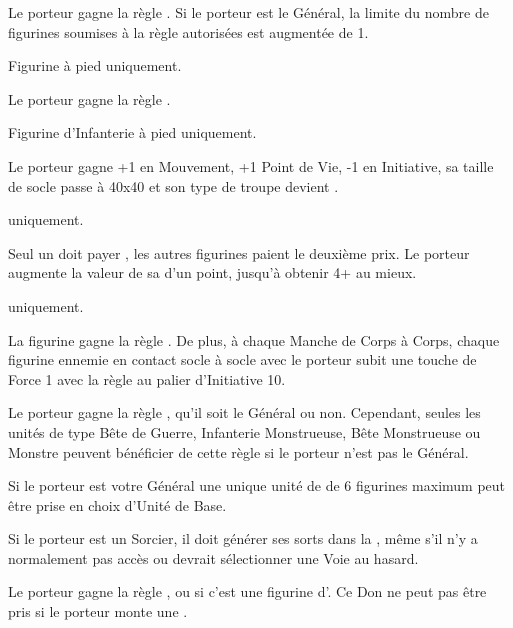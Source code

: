 \begin{multicols}{2}\raggedcolumns

\startpricelistNSP

 Le porteur gagne la règle \terror{}. Si le porteur est le Général, la limite du nombre de figurines soumises à la règle \survivalofthefittest{} autorisées est augmentée de 1.

 Figurine à pied uniquement.

Le porteur gagne la règle .

 Figurine d'Infanterie à pied uniquement.

Le porteur gagne +1 en Mouvement, +1 Point de Vie, -1 en Initiative, sa taille de socle passe à \unit{40x40}{\milli\meter} et son type de troupe devient \monstrousinfantry{}.

\textbf{\dchange} uniquement.

 Seul un \daemonprince{} doit payer , les autres figurines paient le deuxième prix.\newline
Le porteur augmente la valeur de sa \wardsave{} d'un point, jusqu'à obtenir 4+ au mieux.

 \textbf{\pestilence} uniquement.

La figurine gagne la règle \breathweapon{\toxicattacks}. De plus, à chaque Manche de Corps à Corps, chaque figurine ennemie en contact socle à socle avec le porteur subit une touche de Force 1 avec la règle  au palier d'Initiative 10.

\columnbreak
{} Le porteur gagne la règle \inspiringpresence{}, qu'il soit le Général ou non. Cependant, seules les unités de type Bête de Guerre, Infanterie Monstrueuse, Bête Monstrueuse ou Monstre peuvent bénéficier de cette règle si le porteur n'est pas le Général.

Si le porteur est votre Général une unique unité de \wastelandtrolls{} de 6 figurines maximum peut être prise en choix d'Unité de Base.

Si le porteur est un Sorcier, il doit générer ses sorts dans la \Pathof{} \wilderness{}, même s'il n'y a normalement pas accès ou devrait sélectionner une Voie au hasard.

 Le porteur gagne la règle , ou  si c'est une figurine d'\infantry{}. Ce Don ne peut pas être pris si le porteur monte une \manticore{}.


\end{multicols}

